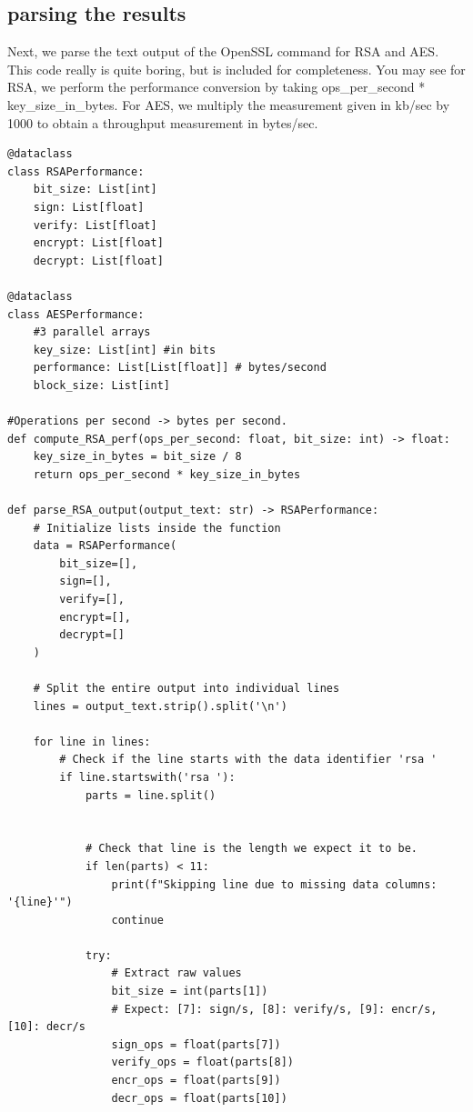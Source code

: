 \documentclass[11pt]{article}
\begin{document}
\subsection*{parsing the results}

Next, we parse the text output of the OpenSSL command for RSA and AES. This code really is quite boring, but is included for completeness. You may see for RSA, we perform the performance conversion by taking ops\_per\_second * key\_size\_in\_bytes. For AES, we multiply the measurement given in kb/sec by 1000 to obtain a throughput measurement in bytes/sec.

\begin{lstlisting}
@dataclass
class RSAPerformance:
    bit_size: List[int]
    sign: List[float]
    verify: List[float]
    encrypt: List[float]
    decrypt: List[float] 

@dataclass
class AESPerformance:
    #3 parallel arrays
    key_size: List[int] #in bits
    performance: List[List[float]] # bytes/second
    block_size: List[int]

#Operations per second -> bytes per second.
def compute_RSA_perf(ops_per_second: float, bit_size: int) -> float:
    key_size_in_bytes = bit_size / 8
    return ops_per_second * key_size_in_bytes

def parse_RSA_output(output_text: str) -> RSAPerformance:
    # Initialize lists inside the function
    data = RSAPerformance(
        bit_size=[],
        sign=[],
        verify=[],
        encrypt=[],
        decrypt=[]
    )

    # Split the entire output into individual lines
    lines = output_text.strip().split('\n')

    for line in lines:
        # Check if the line starts with the data identifier 'rsa '
        if line.startswith('rsa '):
            parts = line.split()

            
            # Check that line is the length we expect it to be.
            if len(parts) < 11:
                print(f"Skipping line due to missing data columns: '{line}'")
                continue
                 
            try:
                # Extract raw values
                bit_size = int(parts[1])
                # Expect: [7]: sign/s, [8]: verify/s, [9]: encr/s, [10]: decr/s
                sign_ops = float(parts[7])
                verify_ops = float(parts[8])
                encr_ops = float(parts[9])
                decr_ops = float(parts[10])


\end{lstlisting}
\end{document}
